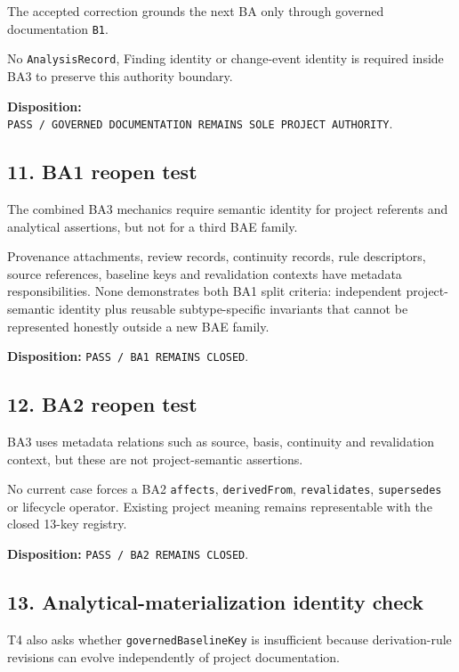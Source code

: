 \documentclass[11pt,a4paper]{article}
\begin{document}
The accepted correction grounds the next BA only through governed documentation \texttt{B1}.

No \texttt{AnalysisRecord}, Finding identity or change-event identity is required inside BA3 to preserve this authority boundary.

\textbf{Disposition:} \texttt{PASS\ /\ GOVERNED\ DOCUMENTATION\ REMAINS\ SOLE\ PROJECT\ AUTHORITY}.

\subsection{11. BA1 reopen test}\label{ba1-reopen-test}

The combined BA3 mechanics require semantic identity for project referents and analytical assertions, but not for a third BAE family.

Provenance attachments, review records, continuity records, rule descriptors, source references, baseline keys and revalidation contexts have metadata responsibilities. None demonstrates both BA1 split criteria: independent project-semantic identity plus reusable subtype-specific invariants that cannot be represented honestly outside a new BAE family.

\textbf{Disposition:} \texttt{PASS\ /\ BA1\ REMAINS\ CLOSED}.

\subsection{12. BA2 reopen test}\label{ba2-reopen-test}

BA3 uses metadata relations such as source, basis, continuity and revalidation context, but these are not project-semantic assertions.

No current case forces a BA2 \texttt{affects}, \texttt{derivedFrom}, \texttt{revalidates}, \texttt{supersedes} or lifecycle operator. Existing project meaning remains representable with the closed 13-key registry.

\textbf{Disposition:} \texttt{PASS\ /\ BA2\ REMAINS\ CLOSED}.

\subsection{13. Analytical-materialization identity check}\label{analytical-materialization-identity-check}

T4 also asks whether \texttt{governedBaselineKey} is insufficient because derivation-rule revisions can evolve independently of project documentation.
\end{document}
